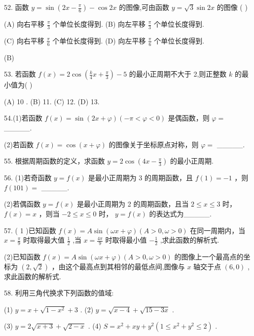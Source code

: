\documentclass[10pt]{article}
\begin{document}
52. 函数 \(y = \sin \left( {{2x} - \frac{\pi }{6}}\right)  - \cos {2x}\) 的图像,可由函数 \(y = \sqrt{3}\sin {2x}\) 的图像 ( )

(A) 向右平移 \(\frac{\pi }{3}\) 个单位长度得到. (B) 向左平移 \(\frac{\pi }{3}\) 个单位长度得到.

(C) 向右平移 \(\frac{\pi }{6}\) 个单位长度得到. (D) 向左平移 \(\frac{\pi }{6}\) 个单位长度得到.

(B)

53. 若函数 \(f\left( x\right)  = 2\cos \left( {\frac{k}{4}x + \frac{\pi }{3}}\right)  - 5\) 的最小正周期不大于 2,则正整数 \(k\) 的最小值为( )

(A) 10 . (B) 11. (C) 12. (D) 13.

54.(1)若函数 \(f\left( x\right)  = \sin \left( {{2x} + \varphi }\right) \left( {-\pi  < \varphi  < 0}\right)\) 是偶函数，则 \(\varphi  =\) \_\_\_\_\_.

(2)若函数 \(f\left( x\right)  = \cos \left( {x + \varphi }\right)\) 的图像关于坐标原点对称，则 \(\varphi  =\) \_\_\_\_\_.

55. 根据周期函数的定义，求函数 \(y = 2\cos \left( {{4x} - \frac{\pi }{3}}\right)\) 的最小正周期.

56. (1)若奇函数 \(y = f\left( x\right)\) 是最小正周期为 3 的周期函数，且 \(f\left( 1\right)  =  - 1\) ，则 \(f\left( {101}\right)  =\) \_\_\_\_\_.

(2)若偶函数 \(y = f\left( x\right)\) 是最小正周期为 2 的周期函数，且当 \(2 \leq  x \leq  3\) 时， \(f\left( x\right)  = x\) ，则当 \(- 2 \leq  x \leq  0\) 时， \(y = f\left( x\right)\) 的表达式为\_\_\_\_\_.

57. ( 1 )已知函数 \(f\left( x\right)  = A\sin \left( {{\omega x} + \varphi }\right) \left( {A > 0,\omega  > 0}\right)\) 在同一周期内，当 \(x = \frac{\pi }{9}\) 时取得最大值 \(\frac{1}{2}\) ,当 \(x = \frac{4\pi }{9}\) 时取得最小值 \(- \frac{1}{2}\) ,求此函数的解析式.

(2)已知函数 \(f\left( x\right)  = A\sin \left( {{\omega x} + \varphi }\right) \left( {A > 0,\omega  > 0}\right)\) 的图像上一个最高点的坐标为 \(\left( {2,\sqrt{2}}\right)\) ，由这个最高点到其相邻的最低点间,图像与 \(x\) 轴交于点 \(\left( {6,0}\right)\) ,求此函数的解析式.

58. 利用三角代换求下列函数的值域:

(1) \(y = x + \sqrt{1 - {x}^{2}} + 3\) . (2) \(y = \sqrt{x - 4} + \sqrt{{15} - {3x}}\) .

(3) \(y = 2\sqrt{x + 3} + \sqrt{2 - x}\) . (4) \(S = {x}^{2} + {xy} + {y}^{2}\left( {1 \leq  {x}^{2} + {y}^{2} \leq  2}\right)\) .
\end{document}
